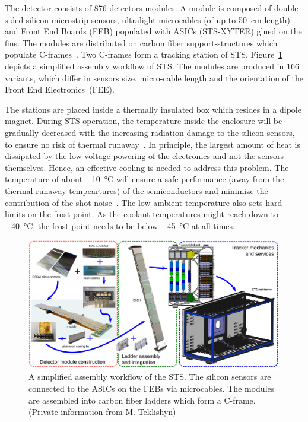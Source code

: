 The detector consists of 876 detectors modules. A module is composed of double-sided silicon microstrip sensors, ultralight microcables (of up to 50~cm length) and Front End Boards (\gls{FEB}) populated with ASICs (STS-XYTER) glued on the fins. The modules are distributed on carbon fiber support-structures which populate C-frames~\cite{progress_report_2016}. Two C-frames form a tracking station of \gls{STS}.  Figure~\ref{fig_assembly} depicts a simplified assembly workflow of \gls{STS}.
The modules are produced in 166 variants, which differ in sensors size, micro-cable length and the orientation of the Front End Electronics~(\gls{FEE}).  


The stations are placed inside a thermally insulated box which resides in a dipole magnet. During \gls{STS} operation, the temperature inside the enclosure will be gradually decreased with the increasing radiation damage to the silicon sensors, to ensure no risk of thermal runaway~\cite{Spieler}. In principle, the largest amount of heat is dissipated by the low-voltage powering of the electronics and not the sensors themselves. Hence, an effective cooling is needed to address this problem.
The temperature of about \SI{-10}{\celsius} will ensure a safe performance (away from the thermal runaway tempeartures) of the semiconductors and minimize the contribution of the shot noise~\cite{Spieler}. The low ambient temperature also sets hard limits on the frost point. As the coolant temperatures might reach down to \SI{-40}{\celsius}, the frost point needs to be below \SI{-45}{\celsius} at all times. 

\newpage
\begin{figure}[!h]
\centering
\includegraphics[width=1\columnwidth]{Chapter2/images/assembly_sequence.png}
\caption{A simplified assembly workflow of the \gls{STS}. The silicon sensors are connected to the ASICs on the \glspl{FEB} via microcables. The modules are assembled into carbon fiber ladders which form a C-frame. (Private information from M. Teklishyn)}
\label{fig_assembly}
\end{figure}

